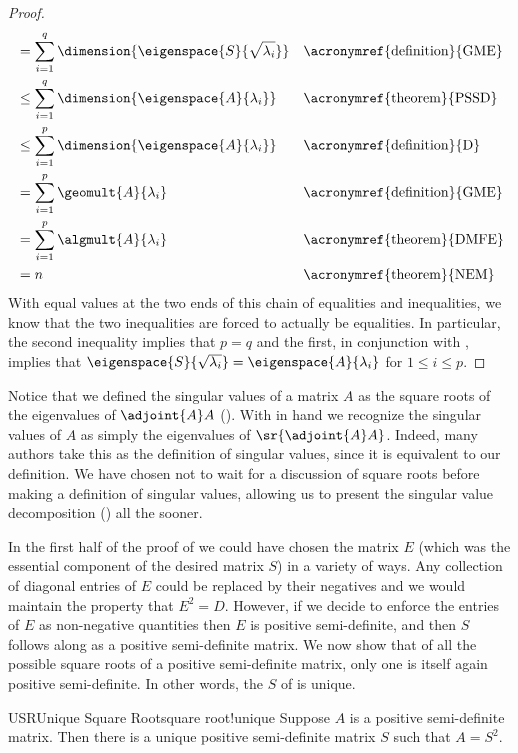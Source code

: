 \begin{proof}
\begin{align*}
&=\sum_{i=1}^{q}\dimension{\eigenspace{S}{\sqrt{\lambda_i}}}&&\text{\acronymref{definition}{GME}}\\
&\leq\sum_{i=1}^{q}\dimension{\eigenspace{A}{\lambda_i}}&&\text{\acronymref{theorem}{PSSD}}\\
&\leq\sum_{i=1}^{p}\dimension{\eigenspace{A}{\lambda_i}}&&\text{\acronymref{definition}{D}}\\
&=\sum_{i=1}^{p}\geomult{A}{\lambda_i}&&\text{\acronymref{definition}{GME}}\\
&=\sum_{i=1}^{p}\algmult{A}{\lambda_i}&&\text{\acronymref{theorem}{DMFE}}\\
&=n&&\text{\acronymref{theorem}{NEM}}
%
\end{align*}
%
With equal values at the two ends of this chain of equalities and inequalities, we know that the two inequalities are forced to actually be equalities.  In particular, the second inequality implies that $p=q$ and the first, in conjunction with , implies that $\eigenspace{S}{\sqrt{\lambda_i}}=\eigenspace{A}{\lambda_i}$ for $1\leq i\leq p$.
%
\end{proof}
%
Notice that we defined the singular values of a matrix $A$ as the square roots of the eigenvalues of $\adjoint{A}A$ ().  With  in hand we recognize the singular values of $A$ as simply the eigenvalues of $\sr{\adjoint{A}A}$.  Indeed, many authors take this as the definition of singular values, since it is equivalent to our definition.  We have chosen not to wait for a discussion of square roots before making a definition of singular values, allowing us to present the singular value decomposition () all the sooner.\par
%
In the first half of the proof of  we could have chosen the matrix $E$ (which was the essential component of the desired matrix $S$) in a variety of ways.  Any collection of diagonal entries of $E$ could be replaced by their negatives and we would maintain the property that $E^2=D$.  However, if we decide to enforce the entries of $E$ as non-negative quantities then $E$ is positive semi-definite, and then $S$ follows along as a positive semi-definite matrix.  We now show that of all the possible square roots of a positive semi-definite matrix, only one is itself again positive semi-definite.  In other words, the $S$ of  is unique.
%
\begin{theorem}{USR}{Unique Square Root}{square root!unique}
Suppose $A$ is a positive semi-definite matrix.  Then there is a unique positive semi-definite matrix $S$ such that $A=S^2$.
\end{theorem}
